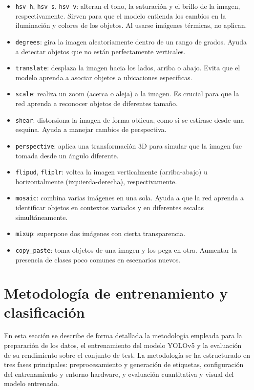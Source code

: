 \documentclass{article}
\begin{document}
	\begin{itemize}
		\item \texttt{hsv\_h}, \texttt{hsv\_s}, \texttt{hsv\_v}: alteran el tono, la saturación y el brillo de la imagen, respectivamente. Sirven para que el modelo entienda los cambios en la iluminación y colores de los objetos. Al usarse imágenes térmicas, no aplican. 
		\item \texttt{degrees}: gira la imagen aleatoriamente dentro de un rango de grados. Ayuda a detectar objetos que no están perfectamente verticales.
		\item \texttt{translate}: desplaza la imagen hacia los lados, arriba o abajo. Evita que el modelo aprenda a asociar objetos a ubicaciones específicas.
		\item \texttt{scale}: realiza un zoom (acerca o aleja) a la imagen. Es crucial para que la red aprenda a reconocer objetos de diferentes tamaño.
		\item \texttt{shear}: distorsiona la imagen de forma oblicua, como si se estirase desde una esquina. Ayuda a manejar cambios de perspectiva.
		\item \texttt{perspective}: aplica una transformación 3D para simular que la imagen fue tomada desde un ángulo diferente.
		\item \texttt{flipud}, \texttt{fliplr}: voltea la imagen verticalmente (arriba-abajo) u horizontalmente (izquierda-derecha), respectivamente.
		\item \texttt{mosaic}: combina varias imágenes en una sola. Ayuda a que la red aprenda a identificar objetos en contextos variados y en diferentes escalas simultáneamente.
		\item \texttt{mixup}: superpone dos imágenes con cierta transparencia. 
		\item \texttt{copy\_paste}: toma objetos de una imagen y los pega en otra. Aumentar la presencia de clases poco comunes en escenarios nuevos.
	\end{itemize}
	\newpage
	\section{Metodología de entrenamiento y clasificación}
	En esta sección se describe de forma detallada la metodología empleada para la preparación de los datos, el entrenamiento del modelo YOLOv5 y la evaluación de su rendimiento sobre el conjunto de test. La metodología se ha estructurado en tres fases principales: preprocesamiento y generación de etiquetas, configuración del entrenamiento y entorno hardware, y evaluación cuantitativa y visual del modelo entrenado.
	
\end{document}
